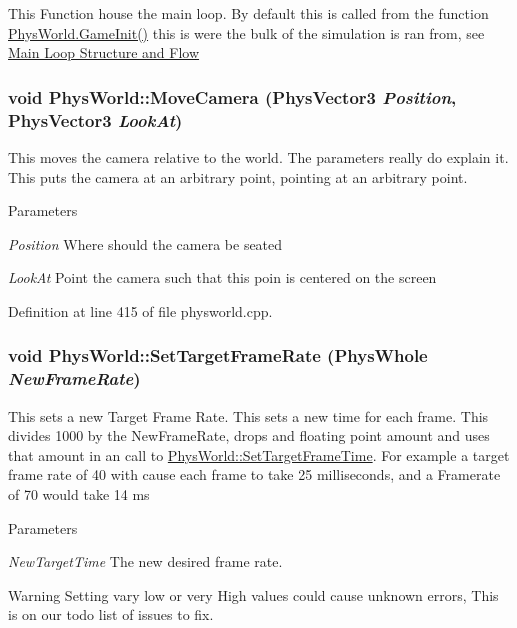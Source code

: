 This Function house the main loop. By default this is called from the function \hyperlink{classPhysWorld_afc5116f97cc1e91e899d1a1ca7e14e9b}{PhysWorld.GameInit()} this is were the bulk of the simulation is ran from, see \hyperlink{mainloop1}{Main Loop Structure and Flow} \hypertarget{classPhysWorld_a1df24ee06d5881825902b60e0d81174a}{
\subsubsection[{MoveCamera}]{\setlength{\rightskip}{0pt plus 5cm}void PhysWorld::MoveCamera ({\bf PhysVector3} {\em Position}, \/  {\bf PhysVector3} {\em LookAt})}}
\label{db/df5/classPhysWorld_a1df24ee06d5881825902b60e0d81174a}


This moves the camera relative to the world. The parameters really do explain it. This puts the camera at an arbitrary point, pointing at an arbitrary point. 
\begin{DoxyParams}{Parameters}
\item[{\em Position}]Where should the camera be seated \item[{\em LookAt}]Point the camera such that this poin is centered on the screen \end{DoxyParams}


Definition at line 415 of file physworld.cpp.\hypertarget{classPhysWorld_af68a05d6ee84d901bb3ed0e175daa662}{
\subsubsection[{SetTargetFrameRate}]{\setlength{\rightskip}{0pt plus 5cm}void PhysWorld::SetTargetFrameRate (PhysWhole {\em NewFrameRate})}}
\label{db/df5/classPhysWorld_af68a05d6ee84d901bb3ed0e175daa662}


This sets a new Target Frame Rate. This sets a new time for each frame. This divides 1000 by the NewFrameRate, drops and floating point amount and uses that amount in an call to \hyperlink{classPhysWorld_ab1c6f9286bd97eb502d8b0ddc4954566}{PhysWorld::SetTargetFrameTime}. For example a target frame rate of 40 with cause each frame to take 25 milliseconds, and a Framerate of 70 would take 14 ms 
\begin{DoxyParams}{Parameters}
\item[{\em NewTargetTime}]The new desired frame rate. \end{DoxyParams}
\begin{DoxyWarning}{Warning}
Setting vary low or very High values could cause unknown errors, This is on our todo list of issues to fix. 
\end{DoxyWarning}


